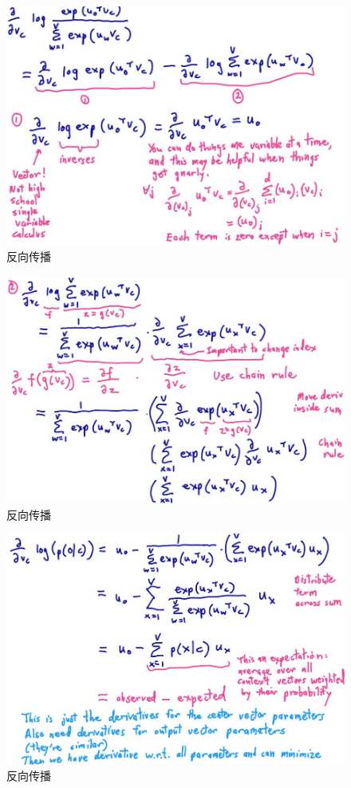 	\begin{figure}[htbp]
	\centering\includegraphics[width=6.5in]{img/6-6.png}
	\caption{反向传播}\label{fig:6-6}
	\end{figure}
	\begin{figure}[htbp]
	\centering\includegraphics[width=6.5in]{img/6-7.png}
	\caption{反向传播}\label{fig:6-7}
	\end{figure}
	
	\begin{figure}[htbp]
	\centering\includegraphics[width=6.5in]{img/6-8.png}
	\caption{反向传播}\label{fig:6-8}
	\end{figure}
	
